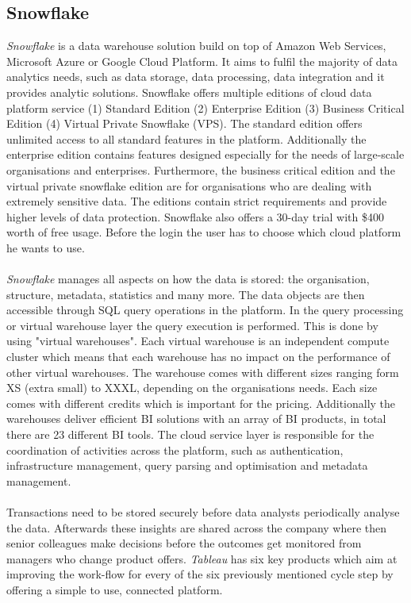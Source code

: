 \documentclass[../paper.tex]{subfiles}
\begin{document}
\subsection{Snowflake}
\textit{Snowflake} is a data warehouse solution build on top of Amazon Web Services, Microsoft Azure or Google Cloud Platform. It aims to fulfil the majority of data analytics needs, such as data storage, data processing, data integration and it provides analytic solutions. Snowflake offers multiple editions of cloud data platform service (1) Standard Edition (2) Enterprise Edition (3) Business Critical Edition (4) Virtual Private Snowflake (VPS).
The standard  edition offers unlimited access to all standard features in the platform. Additionally the enterprise edition contains features designed especially for the needs of large-scale organisations and enterprises.
Furthermore, the business critical edition and the virtual private snowflake edition are for organisations who are dealing with extremely sensitive data. The editions contain strict requirements and provide higher levels of data protection. Snowflake also offers a 30-day trial with \$400 worth of free usage. Before the login the user has to choose which cloud platform he wants to use.
\\ \\
\textit{Snowflake} manages all aspects on how the data is stored: the organisation, structure, metadata, statistics and many more. The data objects are then accessible through SQL query operations in the platform.
In the query processing or virtual warehouse layer the query execution is performed. This is done by using "virtual warehouses". Each virtual warehouse is an independent compute cluster which means that each warehouse has no impact on the performance of other virtual warehouses. The warehouse comes with different sizes ranging form XS (extra small) to XXXL, depending on the organisations needs. Each size comes with different credits which is important for the pricing. Additionally the warehouses deliver efficient BI solutions with an array of BI products, in total there are 23 different BI tools. The cloud service layer is responsible for the coordination of activities across the platform, such as authentication, infrastructure management, query parsing and optimisation and metadata management.
\\ \\

Transactions need to be stored securely before data analysts periodically analyse the data. Afterwards these insights are shared across the company where then senior colleagues make decisions before the outcomes get monitored from managers who change product offers. \textit{Tableau} has six key products which aim at improving the work-flow for every of the six previously mentioned cycle step by offering a simple to use, connected platform.
\end{document}
